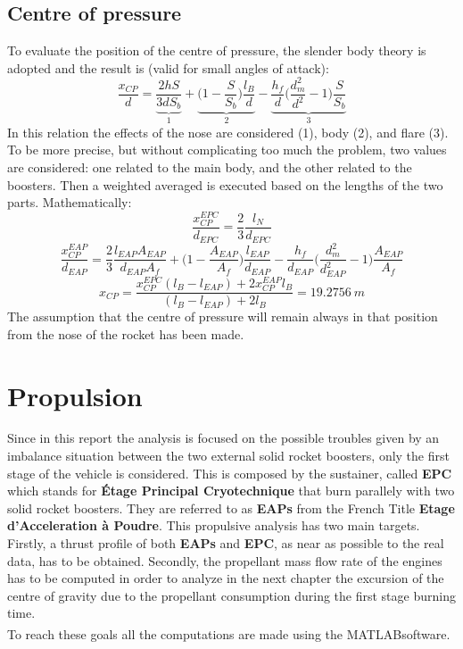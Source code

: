\documentclass[12pt,fleqn,openany]{book} %
\begin{document}
\section{Centre of pressure}
To evaluate the position of the centre of pressure, the slender body theory is adopted and the result is (valid for small angles of attack): 
\begin{equation}
 \frac{x_{CP}}{d}=\underbrace{\frac{2hS}{3dS_b}}_{\text{1}}+\underbrace{\Biggl(1-\frac{S}{S_b}\Biggr)\frac{l_B}{d}}_{\text{2}}-\underbrace{\frac{h_f}{d}\Biggl(\frac{d^2_m}{d^2}-1\Biggr)\frac{S}{S_b}}_{\text{3}}
\end{equation}
In this relation the effects of the nose are considered (1), body (2), and flare (3). To be more precise, but without complicating too much the problem, two values are considered: one related to the main body, and the other related to the boosters. Then a weighted averaged is executed based on the lengths of the two parts. Mathematically: 
\begin{equation}
 \frac{x^{EPC}_{CP}}{d_{EPC}}=\frac{2}{3}\frac{l_N}{d_{EPC}}
\end{equation}
\begin{equation}
 \frac{x_{CP}^{EAP}}{d_{EAP}}=\frac{2}{3}\frac{l_{EAP}A_{EAP}}{d_{EAP}A_f}+\Biggl(1-\frac{A_{EAP}}{A_f}\Biggr)\frac{l_{EAP}}{d_{EAP}}-\frac{h_f}{d_{EAP}}\Biggl(\frac{d^2_m}{d^2_{EAP}}-1\Biggr)\frac{A_{EAP}}{A_f}
\end{equation}
\begin{equation}
 x_{CP}=\frac{x_{CP}^{EPC}(l_B-l_{EAP})+2x_{CP}^{EAP}l_B}{(l_B-l_{EAP})+2l_B}=\SI{19.2756}{m}
\end{equation}
The assumption that the centre of pressure will remain always in that position from the nose of the rocket has been made. 


\chapter{Propulsion}
Since in this report the analysis is focused on the possible troubles given by an imbalance situation between the two external solid rocket boosters, only the first stage of the vehicle is considered. This is composed by the sustainer, called \textbf{EPC} which stands for \textbf{Étage Principal Cryotechnique} that burn parallely with two solid rocket boosters. They are referred to as \textbf{EAPs} from the French Title \textbf{Etage d’Acceleration à Poudre}. This propulsive analysis has two main targets. Firstly, a thrust profile of both \textbf{EAPs} and \textbf{EPC}, as near as possible to the real data, has to be obtained. Secondly, the propellant mass flow rate of the engines has to be computed in order to analyze in the next chapter the excursion of the centre of gravity due to the propellant consumption during the first stage burning time.\\
To reach these goals all the computations are made using the MATLAB\textsuperscript\textregistered software. 
\end{document}
